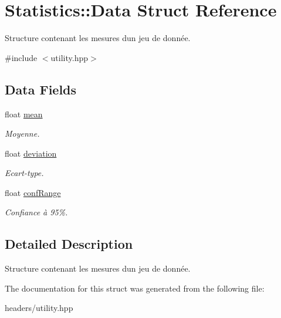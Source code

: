 \hypertarget{structStatistics_1_1Data}{}\section{Statistics\+:\+:Data Struct Reference}
\label{structStatistics_1_1Data}


Structure contenant les mesures d\textquotesingle{}un jeu de donnée.  




{\ttfamily \#include $<$utility.\+hpp$>$}

\subsection*{Data Fields}
\begin{DoxyCompactItemize}
\item 
\mbox{\label{structStatistics_1_1Data_a70c674f35bce1803c894c1df2649ac3f}} 
float \hyperlink{structStatistics_1_1Data_a70c674f35bce1803c894c1df2649ac3f}{mean}
\begin{DoxyCompactList}\small\item\em Moyenne. \end{DoxyCompactList}\item 
\mbox{\label{structStatistics_1_1Data_a4ab98072b8f7055a828ea80077a059f0}} 
float \hyperlink{structStatistics_1_1Data_a4ab98072b8f7055a828ea80077a059f0}{deviation}
\begin{DoxyCompactList}\small\item\em Ecart-\/type. \end{DoxyCompactList}\item 
\mbox{\label{structStatistics_1_1Data_a098a51c15f9d1c2b0d50fd89fc956c06}} 
float \hyperlink{structStatistics_1_1Data_a098a51c15f9d1c2b0d50fd89fc956c06}{conf\+Range}
\begin{DoxyCompactList}\small\item\em Confiance à 95\%. \end{DoxyCompactList}\end{DoxyCompactItemize}


\subsection{Detailed Description}
Structure contenant les mesures d\textquotesingle{}un jeu de donnée. 

The documentation for this struct was generated from the following file\+:\begin{DoxyCompactItemize}
\item 
headers/utility.\+hpp\end{DoxyCompactItemize}
